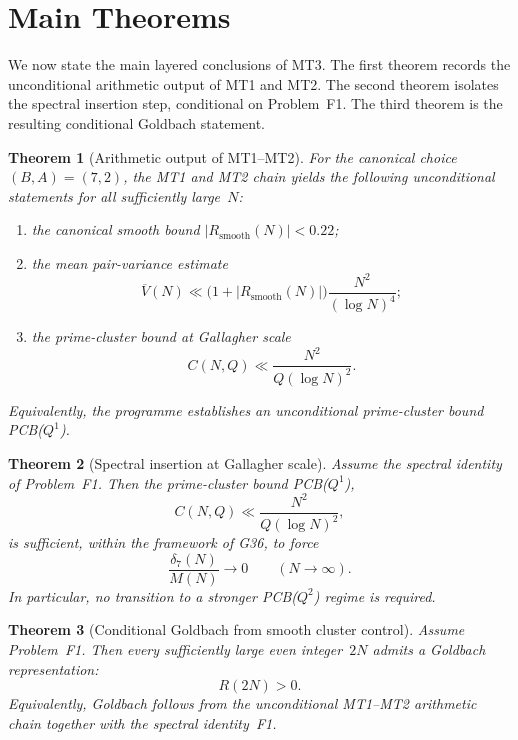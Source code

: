 \documentclass[11pt,a4paper]{article}
\newtheorem{theorem}{Theorem}[section]
\begin{document}
\section{Main Theorems}

We now state the main layered conclusions of MT3. The first theorem records the unconditional arithmetic output of MT1 and MT2. The second theorem isolates the spectral insertion step, conditional on Problem~F1. The third theorem is the resulting conditional Goldbach statement.

\begin{theorem}[Arithmetic output of MT1--MT2]
\label{thm:arithmetic-output}
For the canonical choice $(B,A) = (7,2)$, the MT1 and MT2 chain yields the following unconditional statements for all sufficiently large~$N$:
\begin{enumerate}
    \item the canonical smooth bound $|R_{\mathrm{smooth}}(N)| < 0.22$;
    \item the mean pair-variance estimate
    \[
    \overline{V}(N) \ll \bigl(1 + |R_{\mathrm{smooth}}(N)|\bigr) \frac{N^2}{(\log N)^4};
    \]
    \item the prime-cluster bound at Gallagher scale
    \[
    C(N,Q) \ll \frac{N^2}{Q(\log N)^2}.
    \]
\end{enumerate}
Equivalently, the programme establishes an unconditional prime-cluster bound PCB($Q^1$).
\end{theorem}

\begin{theorem}[Spectral insertion at Gallagher scale]
\label{thm:spectral-insertion}
Assume the spectral identity of Problem~F1. Then the prime-cluster bound PCB($Q^1$),
\[
C(N,Q) \ll \frac{N^2}{Q(\log N)^2},
\]
is sufficient, within the framework of G36, to force
\[
\frac{\delta_7(N)}{M(N)} \to 0 \qquad (N \to \infty).
\]
In particular, no transition to a stronger PCB($Q^2$) regime is required.
\end{theorem}

\begin{theorem}[Conditional Goldbach from smooth cluster control]
\label{thm:conditional-goldbach}
Assume Problem~F1. Then every sufficiently large even integer~$2N$ admits a Goldbach representation:
\[
R(2N) > 0.
\]
Equivalently, Goldbach follows from the unconditional MT1--MT2 arithmetic chain together with the spectral identity~F1.
\end{theorem}
\end{document}
